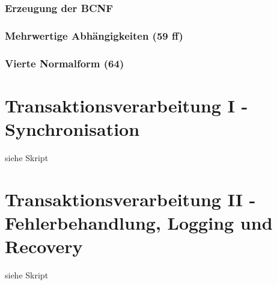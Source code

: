 \subsubsection{Erzeugung der BCNF}
\subsubsection{Mehrwertige Abhängigkeiten (59 ff)}
\subsubsection{Vierte Normalform (64)}
\section{Transaktionsverarbeitung I - Synchronisation}
siehe Skript
\section{ 	Transaktionsverarbeitung II - Fehlerbehandlung, Logging und Recovery}
siehe Skript